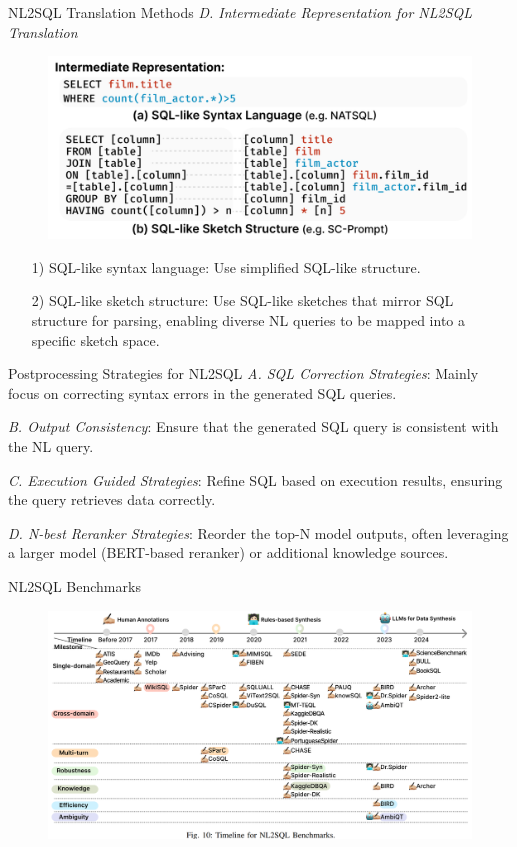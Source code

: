 \documentclass[aspectratio=169,xcolor=dvipsnames]{beamer}
\begin{document}
\begin{frame}{NL2SQL Translation Methods}
    \textit{D. Intermediate Representation for NL2SQL Translation}
    \begin{figure}
        \includegraphics[width=.55\linewidth]{assets/intermediate.png}
    \end{figure}
    \begin{itemize}
        \item[1)]SQL-like syntax language: Use simplified SQL-like structure.
        \item[2)]SQL-like sketch structure: Use SQL-like sketches that mirror SQL structure for parsing, enabling diverse NL queries to be mapped into a specific sketch space.
    \end{itemize}
\end{frame}

\begin{frame}{Postprocessing Strategies for NL2SQL}
    \textit{A. SQL Correction Strategies}: Mainly focus on correcting syntax errors in the generated SQL queries.

    \textit{B. Output Consistency}: Ensure that the generated SQL query is consistent with the NL query.

    \textit{C. Execution Guided Strategies}: Refine SQL based on execution results, ensuring the query retrieves data correctly.

    \textit{D. N-best Reranker Strategies}: Reorder the top-N model outputs, often leveraging a larger model (BERT-based reranker) or additional knowledge sources.
\end{frame}


\begin{frame}{NL2SQL Benchmarks}
    \begin{figure}
        \includegraphics[width=\linewidth]{assets/benchmarks.png}
    \end{figure}
\end{frame}
\end{document}
